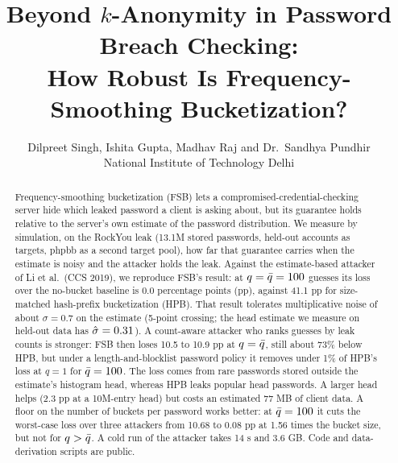 

\title{\bfseries Beyond $k$-Anonymity in Password Breach Checking:\\ How Robust Is Frequency-Smoothing Bucketization?}
\author{\begin{tabular}[t]{c}
Dilpreet Singh, Ishita Gupta, Madhav Raj and Dr.\ Sandhya Pundhir\\
{\footnotesize National Institute of Technology Delhi}
\end{tabular}}  %
\date{}


\maketitle

\begin{abstract}
Frequency-smoothing bucketization (FSB) lets a compromised-credential-checking server hide which leaked password a client is asking about, but its guarantee holds relative to the server's own estimate of the password distribution. We measure by simulation, on the RockYou leak (13.1M stored passwords, held-out accounts as targets, phpbb as a second target pool), how far that guarantee carries when the estimate is noisy and the attacker holds the leak. Against the estimate-based attacker of Li et al.\ (CCS 2019), we reproduce FSB's result: at $q=\bar q=100$ guesses its loss over the no-bucket baseline is 0.0 percentage points (pp), against 41.1 pp for size-matched hash-prefix bucketization (HPB). That result tolerates multiplicative noise of about $\sigma=0.7$ on the estimate (5-point crossing; the head estimate we measure on held-out data has $\hat\sigma=0.31$). A count-aware attacker who ranks guesses by leak counts is stronger: FSB then loses 10.5 to 10.9 pp at $q=\bar q$, still about 73\% below HPB, but under a length-and-blocklist password policy it removes under 1\% of HPB's loss at $q=1$ for $\bar q=100$. The loss comes from rare passwords stored outside the estimate's histogram head, whereas HPB leaks popular head passwords. A larger head helps (2.3 pp at a 10M-entry head) but costs an estimated 77 MB of client data. A floor on the number of buckets per password works better: at $\bar q=100$ it cuts the worst-case loss over three attackers from 10.68 to 0.08 pp at 1.56 times the bucket size, but not for $q>\bar q$. A cold run of the attacker takes 14 s and 3.6 GB. Code and data-derivation scripts are public.
\end{abstract}

